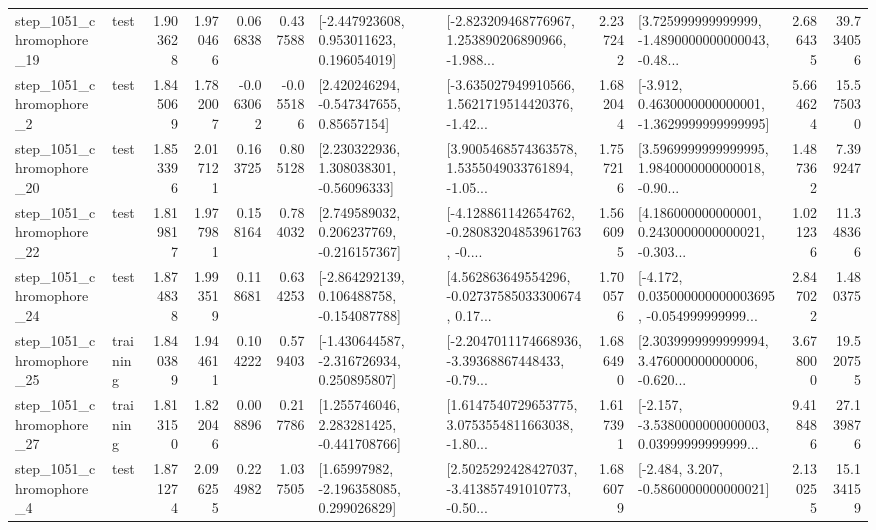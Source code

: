\begin{tabular}{llrrrrllrlrr}
 step\_1051\_chromophore\_19 &      test &      1.903628 &    1.970466 &      0.066838 &  0.437588 &    [-2.447923608, 0.953011623, 0.196054019] &  [-2.823209468776967, 1.253890206890966, -1.988... &       2.237242 &  [3.725999999999999, -1.4890000000000043, -0.48... &            2.686435 &         39.734056 \\
  step\_1051\_chromophore\_2 &      test &      1.845069 &    1.782007 &     -0.063062 & -0.055186 &     [2.420246294, -0.547347655, 0.85657154] &  [-3.635027949910566, 1.5621719514420376, -1.42... &       1.682044 &  [-3.912, 0.4630000000000001, -1.3629999999999995] &            5.664624 &         15.575030 \\
 step\_1051\_chromophore\_20 &      test &      1.853396 &    2.017121 &      0.163725 &  0.805128 &     [2.230322936, 1.308038301, -0.56096333] &  [3.9005468574363578, 1.5355049033761894, -1.05... &       1.757216 &  [3.5969999999999995, 1.9840000000000018, -0.90... &            1.487362 &          7.399247 \\
 step\_1051\_chromophore\_22 &      test &      1.819817 &    1.977981 &      0.158164 &  0.784032 &    [2.749589032, 0.206237769, -0.216157367] &  [-4.128861142654762, -0.28083204853961763, -0.... &       1.566095 &  [4.186000000000001, 0.2430000000000021, -0.303... &            1.021236 &         11.348366 \\
 step\_1051\_chromophore\_24 &      test &      1.874838 &    1.993519 &      0.118681 &  0.634253 &   [-2.864292139, 0.106488758, -0.154087788] &  [4.562863649554296, -0.02737585033300674, 0.17... &       1.700576 &  [-4.172, 0.035000000000003695, -0.054999999999... &            2.847022 &          1.480375 \\
 step\_1051\_chromophore\_25 &  training &      1.840389 &    1.944611 &      0.104222 &  0.579403 &   [-1.430644587, -2.316726934, 0.250895807] &  [-2.2047011174668936, -3.39368867448433, -0.79... &       1.686490 &  [2.3039999999999994, 3.476000000000006, -0.620... &            3.678000 &         19.520755 \\
 step\_1051\_chromophore\_27 &  training &      1.813150 &    1.822046 &      0.008896 &  0.217786 &    [1.255746046, 2.283281425, -0.441708766] &  [1.6147540729653775, 3.0753554811663038, -1.80... &       1.617391 &  [-2.157, -3.5380000000000003, 0.03999999999999... &            9.418486 &         27.139876 \\
  step\_1051\_chromophore\_4 &      test &      1.871274 &    2.096255 &      0.224982 &  1.037505 &     [1.65997982, -2.196358085, 0.299026829] &  [2.5025292428427037, -3.413857491010773, -0.50... &       1.686079 &               [-2.484, 3.207, -0.5860000000000021] &            2.130255 &         15.134159 \\

\end{tabular}
